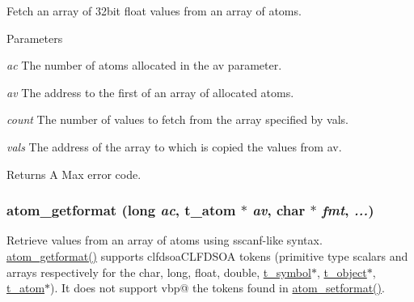 Fetch an array of 32bit float values from an array of atoms. 
\begin{DoxyParams}{Parameters}
\item[{\em ac}]The number of atoms allocated in the av parameter. \item[{\em av}]The address to the first of an array of allocated atoms. \item[{\em count}]The number of values to fetch from the array specified by vals. \item[{\em vals}]The address of the array to which is copied the values from av. \end{DoxyParams}
\begin{DoxyReturn}{Returns}
A Max error code. 
\end{DoxyReturn}
\hypertarget{group__atom_gadf4cd1c3cae12c062fb07ffca5dbf0c0}{
\subsubsection[{atom\_\-getformat}]{ atom\_\-getformat (long {\em ac}, \/  {\bf t\_\-atom} $\ast$ {\em av}, \/  char $\ast$ {\em fmt}, \/   {\em ...})}}
\label{group__atom_gadf4cd1c3cae12c062fb07ffca5dbf0c0}


Retrieve values from an array of atoms using sscanf-\/like syntax. \hyperlink{group__atom_gadf4cd1c3cae12c062fb07ffca5dbf0c0}{atom\_\-getformat()} supports clfdsoaCLFDSOA tokens (primitive type scalars and arrays respectively for the char, long, float, double, \hyperlink{structt__symbol}{t\_\-symbol}$\ast$, \hyperlink{structt__object}{t\_\-object}$\ast$, \hyperlink{structt__atom}{t\_\-atom}$\ast$). It does not support vbp@ the tokens found in \hyperlink{group__atom_ga7a00fdf0699ae5176d39d7ddc3529bf0}{atom\_\-setformat()}.



